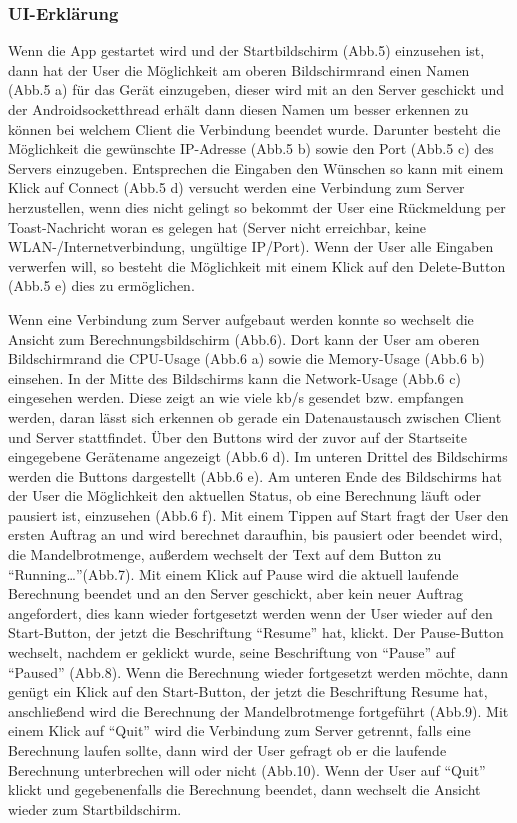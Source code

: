 \documentclass[12pt, onecolumn, notitlepage]{scrartcl}
\begin{document}
\subsubsection{UI-Erklärung}
Wenn die App gestartet wird und der Startbildschirm (Abb.5) einzusehen ist, dann hat der User die Möglichkeit am oberen Bildschirmrand einen Namen (Abb.5 a) für das Gerät einzugeben, dieser wird mit an den Server geschickt und der Androidsocketthread erhält dann diesen Namen um besser erkennen zu können bei welchem Client die Verbindung beendet wurde. Darunter besteht die Möglichkeit die gewünschte IP-Adresse (Abb.5 b) sowie den Port (Abb.5 c) des Servers einzugeben. Entsprechen die Eingaben den Wünschen so kann mit einem Klick auf Connect (Abb.5 d) versucht werden eine Verbindung zum Server herzustellen, wenn dies nicht gelingt so bekommt der User eine Rückmeldung per Toast-Nachricht woran es gelegen hat (Server nicht erreichbar, keine WLAN-/Internetverbindung, ungültige IP/Port). Wenn der User alle Eingaben verwerfen will, so besteht die Möglichkeit mit einem Klick auf den Delete-Button (Abb.5 e) dies zu ermöglichen. \par
Wenn eine Verbindung zum Server aufgebaut werden konnte so wechselt die Ansicht zum Berechnungsbildschirm (Abb.6). Dort kann der User am oberen Bildschirmrand die CPU-Usage (Abb.6 a) sowie die Memory-Usage (Abb.6 b) einsehen. In der Mitte des Bildschirms kann die Network-Usage (Abb.6 c) eingesehen werden. Diese zeigt an wie viele kb/s gesendet bzw. empfangen werden, daran lässt sich erkennen ob gerade ein Datenaustausch zwischen Client und Server stattfindet. Über den Buttons wird der zuvor auf der Startseite eingegebene Gerätename angezeigt (Abb.6 d). Im unteren Drittel des Bildschirms werden die Buttons dargestellt (Abb.6 e). Am unteren Ende des Bildschirms hat der User die Möglichkeit den aktuellen Status, ob eine Berechnung läuft oder pausiert ist, einzusehen (Abb.6 f). Mit einem Tippen auf Start fragt der User den ersten Auftrag an und wird berechnet daraufhin, bis pausiert oder beendet wird, die Mandelbrotmenge, außerdem wechselt der Text auf dem Button zu \enquote{Running…}(Abb.7). Mit einem Klick auf Pause wird die aktuell laufende Berechnung beendet und an den Server geschickt, aber kein neuer Auftrag angefordert, dies kann wieder fortgesetzt werden wenn der User wieder auf den Start-Button, der jetzt die Beschriftung \enquote{Resume} hat, klickt. Der Pause-Button wechselt, nachdem er geklickt wurde, seine Beschriftung von \enquote{Pause} auf \enquote{Paused} (Abb.8). Wenn die Berechnung wieder fortgesetzt werden möchte, dann genügt ein Klick auf den Start-Button, der jetzt die Beschriftung Resume hat, anschließend wird die Berechnung der Mandelbrotmenge fortgeführt (Abb.9). Mit einem Klick auf \enquote{Quit} wird die Verbindung zum Server getrennt, falls eine Berechnung laufen sollte, dann wird der User gefragt ob er die laufende Berechnung unterbrechen will oder nicht (Abb.10). Wenn der User auf \enquote{Quit} klickt und gegebenenfalls die Berechnung beendet, dann wechselt die Ansicht wieder zum Startbildschirm. \\ \\
\end{document}
